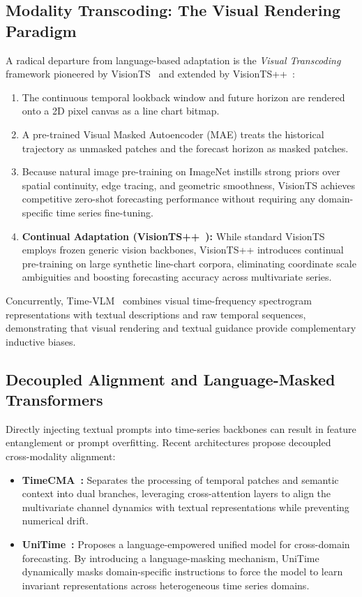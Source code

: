 \subsection{Modality Transcoding: The Visual Rendering Paradigm}
A radical departure from language-based adaptation is the \textit{Visual Transcoding} framework pioneered by VisionTS~\cite{Chen2024VisionTS} and extended by VisionTS++~\cite{Chen2025VisionTSPlus}:
\begin{enumerate}
    \item The continuous temporal lookback window and future horizon are rendered onto a 2D pixel canvas as a line chart bitmap.
    \item A pre-trained Visual Masked Autoencoder (MAE) treats the historical trajectory as unmasked patches and the forecast horizon as masked patches.
    \item Because natural image pre-training on ImageNet instills strong priors over spatial continuity, edge tracing, and geometric smoothness, VisionTS achieves competitive zero-shot forecasting performance without requiring any domain-specific time series fine-tuning.
    \item \textbf{Continual Adaptation (VisionTS++~\cite{Chen2025VisionTSPlus}):} While standard VisionTS employs frozen generic vision backbones, VisionTS++ introduces continual pre-training on large synthetic line-chart corpora, eliminating coordinate scale ambiguities and boosting forecasting accuracy across multivariate series.
\end{enumerate}
Concurrently, Time-VLM~\cite{Zhong2025TimeVLM} combines visual time-frequency spectrogram representations with textual descriptions and raw temporal sequences, demonstrating that visual rendering and textual guidance provide complementary inductive biases.

\subsection{Decoupled Alignment and Language-Masked Transformers}
Directly injecting textual prompts into time-series backbones can result in feature entanglement or prompt overfitting. Recent architectures propose decoupled cross-modality alignment:
\begin{itemize}
    \item \textbf{TimeCMA~\cite{Liu2024TimeCMA}:} Separates the processing of temporal patches and semantic context into dual branches, leveraging cross-attention layers to align the multivariate channel dynamics with textual representations while preventing numerical drift.
    \item \textbf{UniTime~\cite{Liu2024UniTime}:} Proposes a language-empowered unified model for cross-domain forecasting. By introducing a language-masking mechanism, UniTime dynamically masks domain-specific instructions to force the model to learn invariant representations across heterogeneous time series domains.
\end{itemize}

